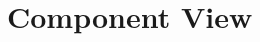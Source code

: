 \documentclass[../../DD.tex]{subfiles}
\begin{document}
\section{Component View\label{sect:2.2}}


\newpage
\end{document}
